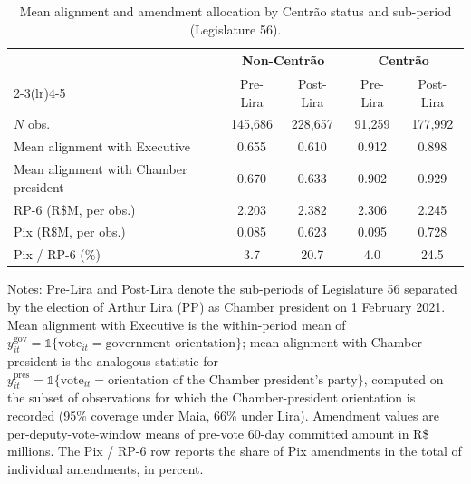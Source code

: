 \documentclass[preprint,12pt,authoryear]{elsarticle}
\begin{document}
\begin{table}[htbp]
\centering
\caption{Mean alignment and amendment allocation by Centr\~ao status and sub-period (Legislature 56).}
\label{tab:centrao_descriptive}
\begin{threeparttable}
\small
\setlength{\tabcolsep}{6pt}
\begin{tabular}{lcccc}
\toprule
& \multicolumn{2}{c}{Non-Centr\~ao} & \multicolumn{2}{c}{Centr\~ao} \\
\cmidrule(lr){2-3}\cmidrule(lr){4-5}
& Pre-Lira & Post-Lira & Pre-Lira & Post-Lira \\
\midrule
$N$ obs.                              & 145{,}686 & 228{,}657 &  91{,}259 & 177{,}992 \\
Mean alignment with Executive         & 0.655 & 0.610 & 0.912 & 0.898 \\
Mean alignment with Chamber president & 0.670 & 0.633 & 0.902 & 0.929 \\
RP-6 (R\$M, per obs.)                  & 2.203 & 2.382 & 2.306 & 2.245 \\
Pix (R\$M, per obs.)                   & 0.085 & 0.623 & 0.095 & 0.728 \\
Pix / RP-6 (\%)                       & 3.7   & 20.7  & 4.0   & 24.5  \\
\bottomrule
\end{tabular}
\begin{tablenotes}
\small
\item Notes: Pre-Lira and Post-Lira denote the sub-periods of Legislature 56 separated by the election of Arthur Lira (PP) as Chamber president on 1 February 2021. Mean alignment with Executive is the within-period mean of $y_{it}^{\mathrm{gov}} = \mathbb{1}\{\text{vote}_{it} = \text{government orientation}\}$; mean alignment with Chamber president is the analogous statistic for $y_{it}^{\mathrm{pres}} = \mathbb{1}\{\text{vote}_{it} = \text{orientation of the Chamber president's party}\}$, computed on the subset of observations for which the Chamber-president orientation is recorded (95\% coverage under Maia, 66\% under Lira). Amendment values are per-deputy-vote-window means of pre-vote 60-day committed amount in R\$ millions. The Pix / RP-6 row reports the share of Pix amendments in the total of individual amendments, in percent.
\end{tablenotes}
\end{threeparttable}
\end{table}

\end{document}
